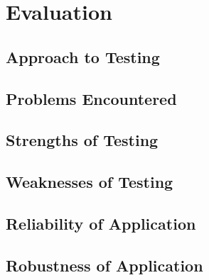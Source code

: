 \section{Evaluation}

\subsection{Approach to Testing}

\subsection{Problems Encountered}

\subsection{Strengths of Testing}

\subsection{Weaknesses of Testing}

\subsection{Reliability of Application}

\subsection{Robustness of Application}